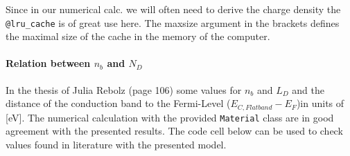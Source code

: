 \documentclass[11pt]{article}
\begin{document}
Since in our numerical calc. we will often need to derive the charge
density the \texttt{@lru\_cache} is of great use here. The maxsize
argument in the brackets defines the maximal size of the cache in the
memory of the computer.

    \hypertarget{relation-between-n_b-and-n_d}{%
\paragraph{\texorpdfstring{Relation between \(n_b\) and
\(N_D\)}{Relation between n\_b and N\_D}}\label{relation-between-n_b-and-n_d}}

In the thesis of Julia Rebolz (page 106) some values for \(n_b\) and
\(L_D\) and the distance of the conduction band to the Fermi-Level
(\(E_{C,Flatband} - E_F\))in units of {[}eV{]}. The numerical
calculation with the provided \texttt{Material} class are in good
agreement with the presented results. The code cell below can be used to
check values found in literature with the presented model.
\end{document}
